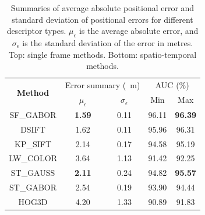 \begin{table}[!h]
\centering

    \begin{tabular}{ c c c c c }
    \hline
     \multirow{2}{*}{\bf Method}  & \multicolumn{2}{c}{Error summary (\SI{}{m})} & \multicolumn{2}{c}{AUC (\%)}\\ \cline{2-5}    
    & $\mu_{\epsilon}$ & $\sigma_{\epsilon}$ & Min & Max \\ \hline

    SF\_GABOR       & \textbf{1.59}             & 0.11             & 96.11   & \textbf{96.39}   \\ \hline
	DSIFT           & 1.62              & 0.11  & 95.96   & 96.31   \\ \hline 

	KP\_SIFT           & 2.14              & 0.17  & 94.58   & 95.19   \\ \hline 

	LW\_COLOR           & 3.64              & 1.13  & 91.42   & 92.25   \\ \hline \hline


	
	ST\_GAUSS        & \textbf{2.11}              & 0.24 & 94.82   & \textbf{95.57}   \\ \hline
    ST\_GABOR       & 2.54              & 0.19 & 93.90   & 94.44   \\ \hline

    HOG3D         & 4.20              & 1.33              & 90.89   & 91.83   \\ \hline
    \end{tabular}


\caption{Summaries of average absolute positional error and standard deviation of positional errors for different descriptor types. $\mu_{\epsilon}$ is the average absolute error, and $\sigma_{\epsilon}$ is the standard deviation of the error in metres. Top: single frame methods. Bottom: spatio-temporal methods.}
\label{Table:summaries}
\end{table}

